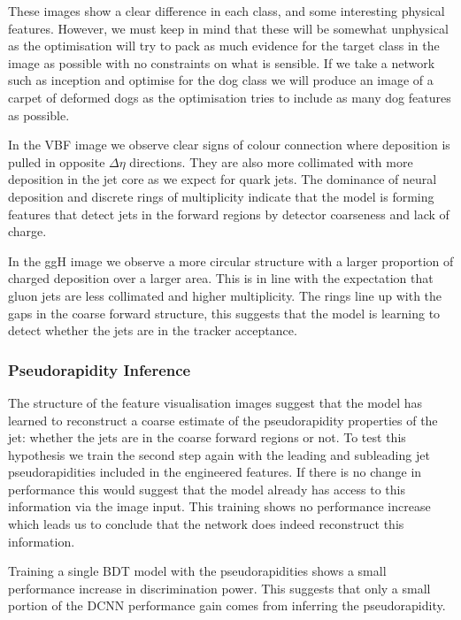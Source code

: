 These images show a clear difference in each class, and some interesting physical features. However, we must keep in mind that these will be somewhat unphysical as the optimisation will try to pack as much evidence for the target class in the image as possible with no constraints on what is sensible. If we take a network such as inception and optimise for the dog class we will produce an image of a carpet of deformed dogs as the optimisation tries to include as many dog features as possible. 


In the VBF image we observe clear signs of colour connection where deposition is pulled in opposite $\Delta\eta$ directions. They are also more collimated with more \pt  deposition in the jet core as we expect for quark jets. The dominance of neural \pt  deposition and discrete rings of multiplicity indicate that the model is forming features that detect jets in the forward regions by detector coarseness and lack of charge. 

In the ggH image we observe a more circular structure with a larger proportion of charged deposition over a larger area. This is in line with the expectation that gluon jets are less collimated and higher multiplicity. The rings line up with the gaps in the coarse forward structure, this suggests that the model is learning to detect whether the jets are in the tracker acceptance. 


\subsubsection{Pseudorapidity Inference}
The structure of the feature visualisation images suggest that the model has learned to reconstruct a coarse estimate of the pseudorapidity properties of the jet: whether the jets are in the coarse forward regions or not. 
To test this hypothesis we train the second step again with the leading and subleading jet pseudorapidities included in the engineered features. If there is no change in performance this would suggest that the model already has access to this information via the image input. This training shows no performance increase which leads us to conclude that the network does indeed reconstruct this information. 

Training a single BDT model with the pseudorapidities shows a small performance increase in discrimination power. This suggests that only a small portion of the DCNN performance gain comes from inferring the pseudorapidity. 


